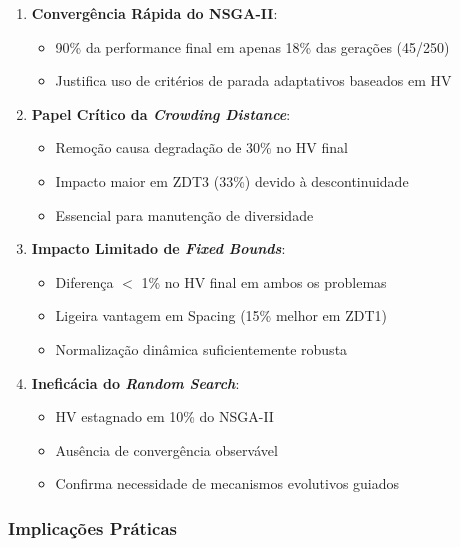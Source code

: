 \begin{enumerate}
    \item \textbf{Convergência Rápida do NSGA-II}:
    \begin{itemize}
        \item 90\% da performance final em apenas 18\% das gerações (45/250)
        \item Justifica uso de critérios de parada adaptativos baseados em HV
    \end{itemize}
    
    \item \textbf{Papel Crítico da \textit{Crowding Distance}}:
    \begin{itemize}
        \item Remoção causa degradação de 30\% no HV final
        \item Impacto maior em ZDT3 (33\%) devido à descontinuidade
        \item Essencial para manutenção de diversidade
    \end{itemize}
    
    \item \textbf{Impacto Limitado de \textit{Fixed Bounds}}:
    \begin{itemize}
        \item Diferença $<$ 1\% no HV final em ambos os problemas
        \item Ligeira vantagem em Spacing (15\% melhor em ZDT1)
        \item Normalização dinâmica suficientemente robusta
    \end{itemize}
    
    \item \textbf{Ineficácia do \textit{Random Search}}:
    \begin{itemize}
        \item HV estagnado em 10\% do NSGA-II
        \item Ausência de convergência observável
        \item Confirma necessidade de mecanismos evolutivos guiados
    \end{itemize}
\end{enumerate}

\subsubsection{Implicações Práticas}

